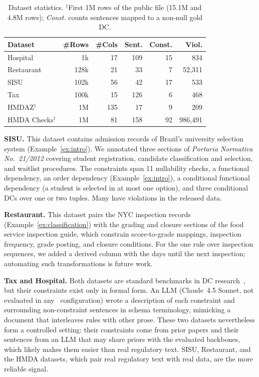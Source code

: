 \begin{table}[ht]
  \centering
  \caption{Dataset statistics. $^{\dagger}$First 1M rows of the public file (15.1M and 4.8M rows); \emph{Const.} counts sentences mapped to a non-null gold DC.}
  \label{tab:datasets}
\small
  \begin{tabular}{lrrrrr}
    \toprule
    \textbf{Dataset} & \textbf{\#Rows} & \textbf{\#Cols} & \textbf{Sent.} & \textbf{Const.} & \textbf{Viol.} \\
    \midrule
    Hospital & 1k & 17 & 109 & 15 & 834 \\
    Restaurant & 128k & 21 & 33 & 7 & 52,311 \\
    SISU & 102k & 56 & 42 & 17 & 533 \\
    Tax & 100k & 15 & 126 & 6 & 468 \\
    HMDAZ$^{\dagger}$ & 1M & 135 & 17 & 9 & 209 \\
    HMDA Checks$^{\dagger}$ & 1M & 81 & 158 & 92 & 986,491 \\
    \bottomrule
  \end{tabular}%
    
\end{table}

\smallskip\noindent\textbf{SISU.}
This dataset contains admission records of Brazil's university selection system (Example~\ref{ex:intro}). We annotated three sections of \textit{Portaria Normativa No.~21/2012} covering student
registration, candidate classification and selection, and waitlist procedures.
The constraints span 11 nullability checks, a functional dependency, an order dependency (Example~\ref{ex:intro}), a conditional functional dependency (a student is selected in at most one option), and three conditional DCs over one or two tuples. Many have violations in the released data.


\smallskip\noindent\textbf{Restaurant.}
This dataset pairs the NYC inspection records (Example~\ref{ex:classification}) with the grading and closure sections of the food service inspection guide, which constrain score-to-grade mappings, inspection frequency, grade posting, and closure conditions. For the one rule over inspection sequences, we added a derived column with the days until the next inspection; automating such transformations is future work.


\smallskip\noindent\textbf{Tax and Hospital.}
Both datasets are standard benchmarks in DC research~\cite{chu2013discovering,holoclean}, but their constraints exist only in formal form. An LLM (Claude~4.5 Sonnet, not evaluated in any \system\ configuration) wrote a description of each constraint and surrounding non-constraint sentences in schema terminology, mimicking a document that interleaves rules with other prose. These two datasets nevertheless form a controlled setting: their constraints come from prior papers and their sentences from an LLM that may share priors with the evaluated backbones, which likely makes them easier than real regulatory text. SISU, Restaurant, and the HMDA datasets, which pair real regulatory text with real data, are the more reliable signal.




